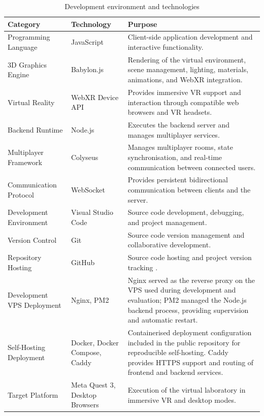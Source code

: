 \begin{table}[H]
\centering
\caption{Development environment and technologies}
\label{tab:development_technologies}

\renewcommand{\arraystretch}{1.3}

\begin{tabular}{p{4cm}p{4cm}p{7cm}}
\toprule
\textbf{Category} & \textbf{Technology} & \textbf{Purpose} \\
\midrule

Programming Language &
JavaScript &
Client-side application development and interactive functionality. \\

3D Graphics Engine &
Babylon.js &
Rendering of the virtual environment, scene management, lighting, materials, animations, and WebXR integration. \\

Virtual Reality &
WebXR Device API &
Provides immersive VR support and interaction through compatible web browsers and VR headsets. \\

Backend Runtime &
Node.js &
Executes the backend server and manages multiplayer services. \\

Multiplayer Framework &
Colyseus &
Manages multiplayer rooms, state synchronisation, and real-time communication between connected users. \\

Communication Protocol &
WebSocket &
Provides persistent bidirectional communication between clients and the server. \\

Development Environment &
Visual Studio Code &
Source code development, debugging, and project management. \\

Version Control &
Git &
Source code version management and collaborative development. \\

Repository Hosting &
GitHub &
Source code hosting and project version tracking \cite{thesisRepo}. \\

Development VPS Deployment &
Nginx, PM2 &
Nginx served as the reverse proxy on the VPS used during development and evaluation; PM2 managed the Node.js backend process, providing supervision and automatic restart. \\

Self-Hosting Deployment &
Docker, Docker Compose, Caddy &
Containerised deployment configuration included in the public repository for reproducible self-hosting. Caddy provides HTTPS support and routing of frontend and backend services. \\

Target Platform &
Meta Quest 3, Desktop Browsers &
Execution of the virtual laboratory in immersive VR and desktop modes. \\

\bottomrule
\end{tabular}

\end{table}

